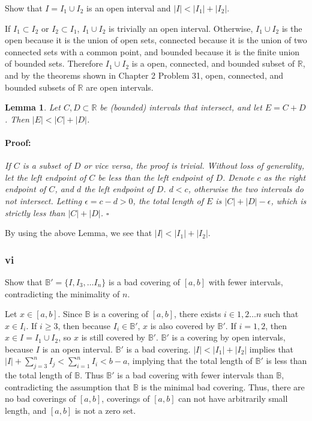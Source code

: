 \documentclass{article}
\newenvironment{proof}{\paragraph{Proof:}}{\hfill$\square$}
\newtheorem{lemma}[theorem]{Lemma}
\newcommand{\R}{\mathbb{R}}
\newcommand{\B}{\mathbb{B}}
\begin{document}
Show that $I = I_1 \cup I_2$ is an open interval and $|I| < |I_1| + |I_2|$.

If $I_1 \subset I_2$ or $I_2 \subset I_1$, $I_1 \cup I_2$ is trivially an open interval. Otherwise, $I_1 \cup I_2$ is the open because it is the union of open sets, connected because it is the union of two connected sets with a common point, and bounded because it is the finite union of bounded sets. Therefore $I_1 \cup I_2$ is a open, connected, and bounded subset of $\R$, and by the theorems shown in Chapter 2 Problem 31, open, connected, and bounded subsets of $\R$ are open intervals.

\begin{lemma}
Let $C, D \subset \R$ be (bounded) intervals that intersect, and let $E = C + D$. Then $|E| < |C| + |D|$.

\begin{proof}
If $C$ is a subset of $D$ or vice versa, the proof is trivial. Without loss of generality, let the left endpoint of $C$ be less than the left endpoint of $D$. Denote $c$ as the right endpoint of $C$, and $d$ the left endpoint of $D$. $d < c$, otherwise the two intervals do not intersect. Letting $\epsilon = c - d > 0$, the total length of $E$ is $|C| + |D| - \epsilon$, which is strictly less than $|C| + |D|$.
\end{proof}
\end{lemma}

By using the above Lemma, we see that $|I| < |I_1| + |I_2|$.

\subsubsection*{vi}

Show that $\B' = \{I, I_3, \dots I_n\}$ is a bad covering of $[a, b]$ with fewer intervals, contradicting the minimality of $n$.

Let $x \in [a, b]$. Since $\B$ is a covering of $[a, b]$, there exists $i \in 1, 2 \dots n$ such that $x \in I_i$. If $i \geq 3$, then because $I_i \in \B'$, $x$ is also covered by $\B'$. If $i = 1, 2$, then $x \in I = I_1 \cup I_2$, so $x$ is still covered by $\B'$. $\B'$ is a covering by open intervals, because $I$ is an open interval. $\B'$ is a bad covering. $|I| < |I_1| + |I_2|$ implies that $|I| + \sum_{j=3}^n I_j < \sum_{i=1}^n I_i < b-a$, implying that the total length of $\B'$ is less than the total length of $\B$. Thus $\B'$ is a bad covering with fewer intervals than $\B$, contradicting the assumption that $\B$ is the minimal bad covering. Thus, there are no bad coverings of $[a, b]$, coverings of $[a, b]$ can not have arbitrarily small length, and $[a, b]$ is not a zero set.
\end{document}
